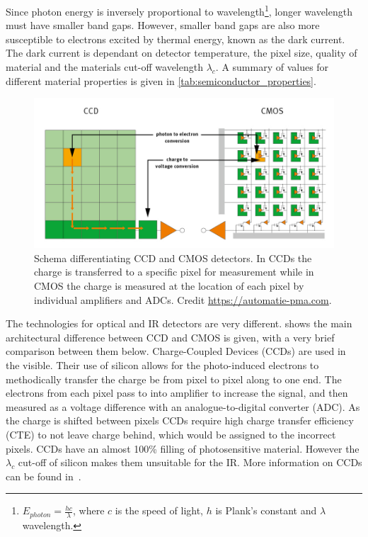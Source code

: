 Since photon energy is inversely proportional to wavelength\footnote{\(E_{photon} = \frac{h c}{\lambda}\), where $c$ is the speed of light, $h$ is Plank's constant and $\lambda$ wavelength.}, longer wavelength must have smaller band gaps.
However, smaller band gaps are also more susceptible to electrons excited by thermal energy, known as the dark current.
The dark current is dependant on detector temperature, the pixel size, quality of material and the materials cut-off wavelength $\lambda_c$.
A summary of values for different material properties is given in \cref{tab:semiconductor_properties}.



\begin{figure}
    \centering
    \includegraphics[width=0.8\linewidth]{figures/spectroscopy/CMOS-vs-CCD-schema}
    \caption[Schema differentiating {CCD} and {CMOS} detectors.]{Schema differentiating {CCD} and {CMOS} detectors.
    In {CCDs} the charge is transferred to a specific pixel for measurement while in {CMOS} the charge is measured at the location of each pixel by individual amplifiers and {ADCs}.
    Credit \href{https://automatie-pma.com/pma/innovatie-en-technologie-pma/cmos-vervangt-steeds-meer-hoogwaardige-ccd-toepassingen/}{https://automatie-pma.com}.}
    \label{fig:cmos-vs-ccd-schema}
\end{figure}

The technologies for optical and {IR} detectors are very different.
 shows the main architectural difference between {CCD} and {CMOS} is given, with a very brief comparison between them below.
Charge-Coupled Devices ({CCDs}) are used in the visible.
Their use of silicon allows for the photo-induced electrons to methodically transfer the charge be from pixel to pixel along to one end.
The electrons from each pixel pass to into amplifier to increase the signal, and then measured as a voltage difference with an analogue-to-digital converter (ADC).
As the charge is shifted between pixels {CCDs} require high charge transfer efficiency (CTE) to not leave charge behind, which would be assigned to the incorrect pixels.
{CCDs} have an almost 100\% filling of photosensitive material.
However the $\lambda_c$ cut-off of silicon makes them unsuitable for the {IR}.
More information on {CCDs} can be found in~\citep{howell_handbook_2000}.

